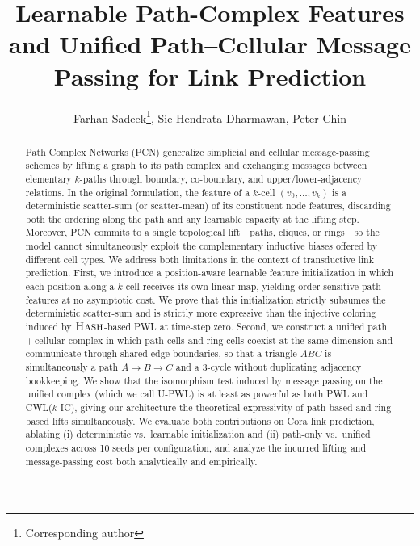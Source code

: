 \documentclass[letterpaper]{article} %
\title{Learnable Path-Complex Features and Unified Path--Cellular Message Passing for Link Prediction}
\author{
    Farhan Sadeek\thanks{Corresponding author}, Sie Hendrata Dharmawan, Peter Chin
}
\begin{document}
\nocopyright
\maketitle

\begin{abstract}
Path Complex Networks (PCN) generalize simplicial and cellular message-passing schemes by lifting a graph to its path complex and exchanging messages between elementary \(k\)-paths through boundary, co-boundary, and upper/lower-adjacency relations. In the original formulation, the feature of a \(k\)-cell \((v_0, \ldots, v_k)\) is a deterministic scatter-sum (or scatter-mean) of its constituent node features, discarding both the ordering along the path and any learnable capacity at the lifting step. Moreover, PCN commits to a single topological lift---paths, cliques, or rings---so the model cannot simultaneously exploit the complementary inductive biases offered by different cell types. We address both limitations in the context of transductive link prediction. First, we introduce a position-aware learnable feature initialization in which each position along a \(k\)-cell receives its own linear map, yielding order-sensitive path features at no asymptotic cost. We prove that this initialization strictly subsumes the deterministic scatter-sum and is strictly more expressive than the injective coloring induced by \(\textsc{Hash}\)-based PWL at time-step zero. Second, we construct a unified path\,+\,cellular complex in which path-cells and ring-cells coexist at the same dimension and communicate through shared edge boundaries, so that a triangle \(ABC\) is simultaneously a path \(A{\to}B{\to}C\) and a \(3\)-cycle without duplicating adjacency bookkeeping. We show that the isomorphism test induced by message passing on the unified complex (which we call U-PWL) is at least as powerful as both PWL and CWL(\(k\)-IC), giving our architecture the theoretical expressivity of path-based and ring-based lifts simultaneously. We evaluate both contributions on Cora link prediction, ablating (i) deterministic vs.\ learnable initialization and (ii) path-only vs.\ unified complexes across 10 seeds per configuration, and analyze the incurred lifting and message-passing cost both analytically and empirically.
\end{abstract}
\end{document}
